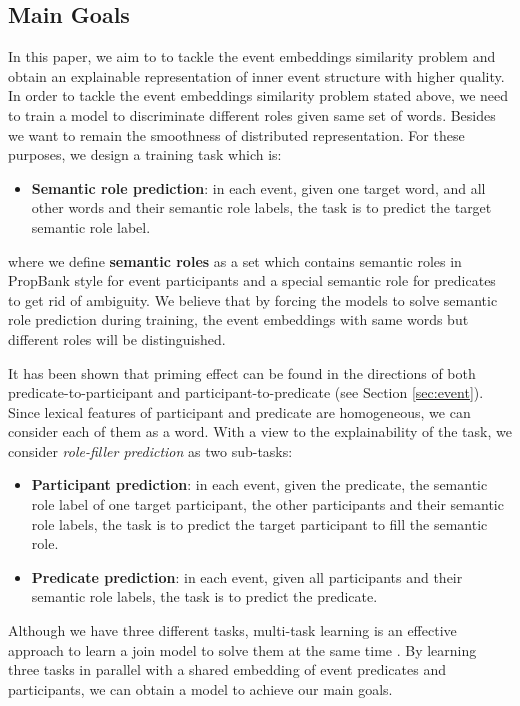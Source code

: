 \documentclass[a4paper]{article}
\begin{document}
\subsection{Main Goals} \label{sec:tasks}
In this paper, we aim to to tackle the event embeddings similarity problem and obtain an explainable representation of inner event structure with higher quality. In order to tackle the event embeddings similarity problem stated above, we need to train a model to discriminate different roles given same set of words. Besides we want to remain the smoothness of distributed representation. For these purposes, we design a training task which is: 
\begin{itemize}
  \item  \textbf{Semantic role prediction}: in each event, given one target word, and all other words and their semantic role labels, the task is to predict the target semantic role label. 
\end{itemize}
where we define \textbf{semantic roles} as a set which contains semantic roles in PropBank style for event participants and a special semantic role for predicates to get rid of ambiguity. We believe that by forcing the models to solve semantic role prediction during training, the event embeddings with same words but different roles will be distinguished. 

It has been shown that priming effect can be found in the directions of both predicate-to-participant and participant-to-predicate (see Section \ref{sec:event}). Since lexical features of participant and predicate are homogeneous, we can consider each of them as a word. With a view to the explainability of the task, we consider \textit{role-filler prediction} as two sub-tasks: 
\begin{itemize}
  \item  \textbf{Participant prediction}: in each event, given the predicate, the semantic role label of one target participant, the other participants and their semantic role labels, the task is to predict the target participant to fill the semantic role. 
  \item  \textbf{Predicate prediction}: in each event, given all participants and their semantic role labels, the task is to predict the predicate. 
\end{itemize}

Although we have three different tasks, multi-task learning is an effective approach to learn a join model to solve them at the same time \citep{caruana1998multitask}. By learning three tasks in parallel with a shared embedding of event predicates and participants, we can obtain a model to achieve our main goals. 
\end{document}
